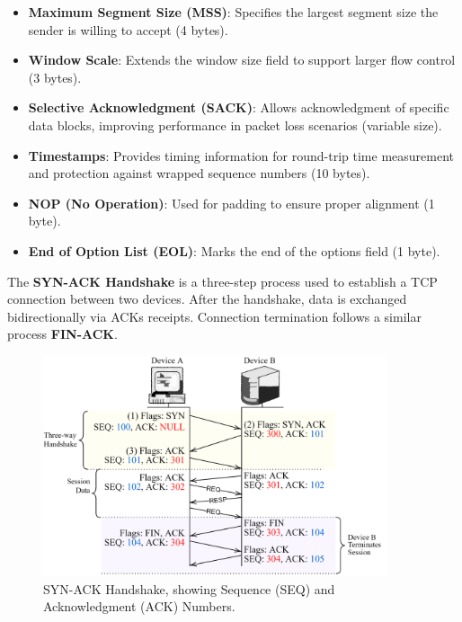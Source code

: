 \newpage
\begin{Def}

    \begin{itemize}
        \item \textbf{Maximum Segment Size (MSS)}: Specifies the largest segment size the sender is willing to accept (4 bytes).
        \item \textbf{Window Scale}: Extends the window size field to support larger flow control (3 bytes).
        \item \textbf{Selective Acknowledgment (SACK)}: Allows acknowledgment of specific data blocks, improving performance in packet loss scenarios (variable size).
        \item \textbf{Timestamps}: Provides timing information for round-trip time measurement and protection against wrapped sequence numbers (10 bytes).
        \item \textbf{NOP (No Operation)}: Used for padding to ensure proper alignment (1 byte).
        \item \textbf{End of Option List (EOL)}: Marks the end of the options field (1 byte). \hfill \cite{rfc793}
    \end{itemize}

\end{Def}

\vspace{-.5em}
\begin{Def}

    The \textbf{SYN-ACK Handshake} is a three-step process used to establish a TCP connection between two devices.
    After the handshake, data is exchanged bidirectionally via ACKs receipts. Connection termination follows a similar process \textbf{FIN-ACK}.
\end{Def}

\vspace{-1em}
\begin{figure}[h!]
    \hspace{2em}
    \includegraphics[width=0.9\textwidth]{Sections/network/synack.png}
    \caption{SYN-ACK Handshake, showing Sequence (SEQ) and Acknowledgment (ACK) Numbers.}
    \label{fig:tcp_options}
\end{figure}

